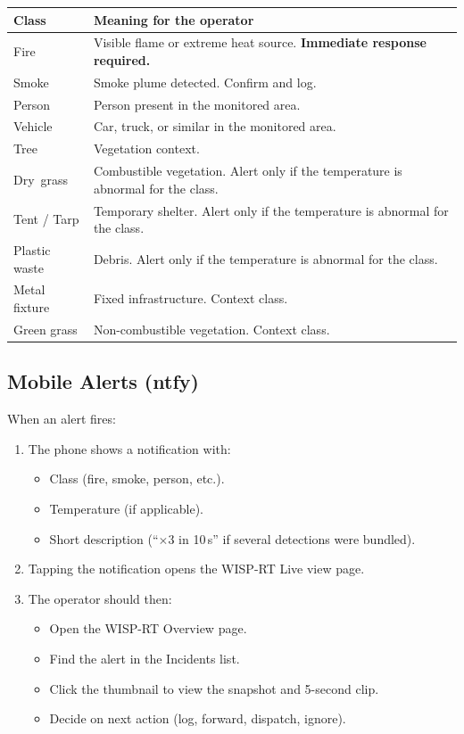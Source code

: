 \documentclass[11pt,letterpaper]{article}
\begin{document}
\begin{tabular}{@{}p{3.5cm}p{11.5cm}@{}}
\toprule
\textbf{Class} & \textbf{Meaning for the operator} \\
\midrule
Fire            & Visible flame or extreme heat source. \textbf{Immediate response required.} \\
Smoke           & Smoke plume detected. Confirm and log. \\
Person          & Person present in the monitored area. \\
Vehicle         & Car, truck, or similar in the monitored area. \\
Tree            & Vegetation context. \\
Dry\ grass      & Combustible vegetation. Alert only if the temperature is abnormal for the class. \\
Tent / Tarp     & Temporary shelter. Alert only if the temperature is abnormal for the class. \\
Plastic waste   & Debris. Alert only if the temperature is abnormal for the class. \\
Metal fixture   & Fixed infrastructure. Context class. \\
Green grass     & Non-combustible vegetation. Context class. \\
\bottomrule
\end{tabular}

\subsection{Mobile Alerts (ntfy)}

When an alert fires:

\begin{enumerate}[leftmargin=1.5em]
  \item The phone shows a notification with:
    \begin{itemize}[leftmargin=1.2em]
      \item Class (fire, smoke, person, etc.).
      \item Temperature (if applicable).
      \item Short description (``$\times$3 in 10\,s'' if several detections were bundled).
    \end{itemize}
  \item Tapping the notification opens the WISP-RT Live view page.
  \item The operator should then:
    \begin{itemize}[leftmargin=1.2em]
      \item Open the WISP-RT Overview page.
      \item Find the alert in the Incidents list.
      \item Click the thumbnail to view the snapshot and 5-second clip.
      \item Decide on next action (log, forward, dispatch, ignore).
    \end{itemize}
\end{enumerate}
\end{document}
